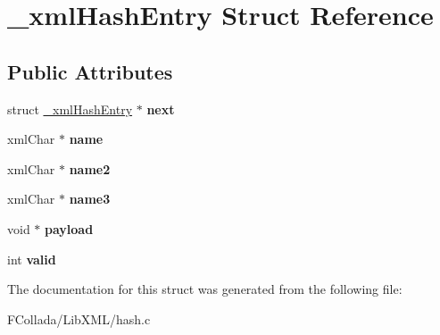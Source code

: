 \hypertarget{struct__xmlHashEntry}{
\section{\_\-xmlHashEntry Struct Reference}
\label{struct__xmlHashEntry}
}
\subsection*{Public Attributes}
\begin{DoxyCompactItemize}
\item 
\hypertarget{struct__xmlHashEntry_a8c09dc3f067cf91f1bb29209e0c12465}{
struct \hyperlink{struct__xmlHashEntry}{\_\-xmlHashEntry} $\ast$ {\bfseries next}}
\label{struct__xmlHashEntry_a8c09dc3f067cf91f1bb29209e0c12465}

\item 
\hypertarget{struct__xmlHashEntry_a30ee5fb9f0de9fb853b114d0ca72e4ee}{
xmlChar $\ast$ {\bfseries name}}
\label{struct__xmlHashEntry_a30ee5fb9f0de9fb853b114d0ca72e4ee}

\item 
\hypertarget{struct__xmlHashEntry_a00273e872b063b4d020a3d8393ab5c13}{
xmlChar $\ast$ {\bfseries name2}}
\label{struct__xmlHashEntry_a00273e872b063b4d020a3d8393ab5c13}

\item 
\hypertarget{struct__xmlHashEntry_af3500ed724e2a4bc0e4f858cee868539}{
xmlChar $\ast$ {\bfseries name3}}
\label{struct__xmlHashEntry_af3500ed724e2a4bc0e4f858cee868539}

\item 
\hypertarget{struct__xmlHashEntry_ad71f2701fe02452e1f52606ff8b83b8b}{
void $\ast$ {\bfseries payload}}
\label{struct__xmlHashEntry_ad71f2701fe02452e1f52606ff8b83b8b}

\item 
\hypertarget{struct__xmlHashEntry_a9a1667fa1458f4b788b0ac96bad8f82f}{
int {\bfseries valid}}
\label{struct__xmlHashEntry_a9a1667fa1458f4b788b0ac96bad8f82f}

\end{DoxyCompactItemize}


The documentation for this struct was generated from the following file:\begin{DoxyCompactItemize}
\item 
FCollada/LibXML/hash.c\end{DoxyCompactItemize}
